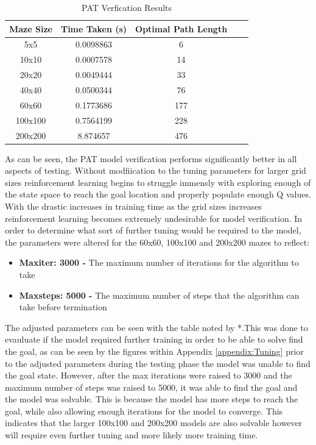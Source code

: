 \documentclass[twoside, 12pt, a4paper]{article}
\begin{document}
\begin{table}[ht]
\begin {center}
\begin{tabular}{ | c | c | c | c | c |}
\hline
 \textbf{Maze Size} & \textbf{ Time Taken (s)} &  \textbf{Optimal Path Length}  \\
\hline
5x5 		& 0.0098863	& 6	 \\
10x10 	& 0.0007578	& 14	 \\
20x20 	& 0.0049444 & 33	 \\
40x40		& 0.0500344	& 76	 \\
60x60 	& 0.1773686	& 177	 \\
100x100	& 0.7564199	& 228	 \\
200x200	& 8.874657	& 476	 \\
\hline
\end {tabular}
\caption{\label{tab:table-name}PAT Verfication Results}
\end {center}
\end{table}
\newpage
As can be seen, the PAT model verification performs significantly better in all aspects of testing. Without modfiication to the tuning parameters for larger grid sizes reinforcement learning begins to struggle immensly with exploring enough of the state space to reach the goal location and properly populate enough Q values. With the drastic increases in training time as the grid sizes increases reinforcement learning becomes extremely undesirable for model verification. In order to determine what sort of further tuning would be required to the model, the parameters were altered for the 60x60, 100x100 and 200x200 mazes to reflect:
\begin{itemize}
\item \textbf{Maxiter: 3000 -} The maximum number of iterations for the algorithm to take
\item \textbf{Maxsteps: 5000 -} The maximum number of steps that the algorithm can take before termination
\end{itemize}
The adjusted parameters can be seen with the table noted by *.This was done to evauluate if the model required further training in order to be able to solve find the goal, as can be seen by the figures within Appendix \ref{appendix:Tuning} prior to the adjusted parameters during the testing phase the model was unable to find the goal state. However, after the max iterations were raised to 3000 and the maximum number of steps was raised to 5000,  it was able to find the goal and the model was solvable. This is because the model has more steps to reach the goal, while also allowing enough iterations for the model to converge. This indicates that the larger 100x100  and 200x200 models are also solvable however will require even further tuning and more likely more training time. \\
\end{document}
